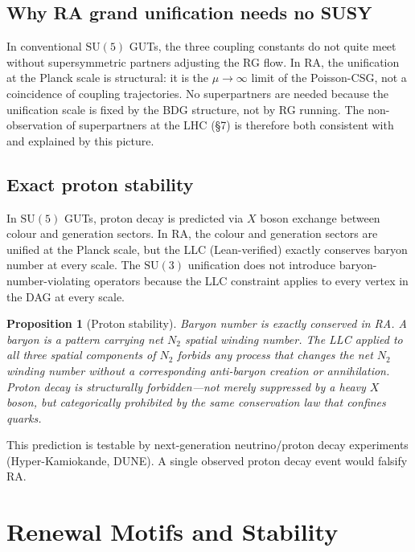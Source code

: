 \documentclass[11pt]{article}
\newtheorem{proposition}{Proposition}
\begin{document}
\subsection{Why RA grand unification needs no SUSY}

In conventional $\mathrm{SU}(5)$ GUTs, the three coupling constants do not quite meet without supersymmetric partners adjusting the RG flow. In RA, the unification at the Planck scale is structural: it is the $\mu\to\infty$ limit of the Poisson-CSG, not a coincidence of coupling trajectories. No superpartners are needed because the unification scale is fixed by the BDG structure, not by RG running. The non-observation of superpartners at the LHC (\S7) is therefore both consistent with and explained by this picture.

\subsection{Exact proton stability}

In $\mathrm{SU}(5)$ GUTs, proton decay is predicted via $X$ boson exchange between colour and generation sectors. In RA, the colour and generation sectors are unified at the Planck scale, but the LLC (Lean-verified) exactly conserves baryon number at every scale. The $\mathrm{SU}(3)$ unification does not introduce baryon-number-violating operators because the LLC constraint applies to every vertex in the DAG at every scale.

\begin{proposition}[Proton stability]
Baryon number is exactly conserved in RA. A baryon is a pattern carrying net $N_2$ spatial winding number. The LLC applied to all three spatial components of $N_2$ forbids any process that changes the net $N_2$ winding number without a corresponding anti-baryon creation or annihilation. Proton decay is structurally forbidden---not merely suppressed by a heavy $X$ boson, but categorically prohibited by the same conservation law that confines quarks.
\end{proposition}

This prediction is testable by next-generation neutrino/proton decay experiments (Hyper-Kamiokande, DUNE). A single observed proton decay event would falsify RA.

\section{Renewal Motifs and Stability}
\label{sec:motifs}
\end{document}
